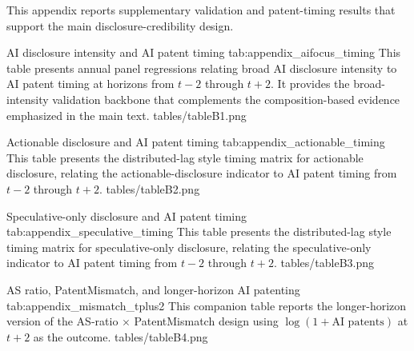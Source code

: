 This appendix reports supplementary validation and patent-timing results that support the main disclosure-credibility design.

\apptablepdf
{AI disclosure intensity and AI patent timing}
{tab:appendix_aifocus_timing}
{This table presents annual panel regressions relating broad AI disclosure intensity to AI patent timing at horizons from $t-2$ through $t+2$. It provides the broad-intensity validation backbone that complements the composition-based evidence emphasized in the main text.}
{tables/tableB1.png}

\apptablepdf
{Actionable disclosure and AI patent timing}
{tab:appendix_actionable_timing}
{This table presents the distributed-lag style timing matrix for actionable disclosure, relating the actionable-disclosure indicator to AI patent timing from $t-2$ through $t+2$.}
{tables/tableB2.png}

\apptablepdf
{Speculative-only disclosure and AI patent timing}
{tab:appendix_speculative_timing}
{This table presents the distributed-lag style timing matrix for speculative-only disclosure, relating the speculative-only indicator to AI patent timing from $t-2$ through $t+2$.}
{tables/tableB3.png}

\apptablepdf
{AS ratio, PatentMismatch, and longer-horizon AI patenting}
{tab:appendix_mismatch_tplus2}
{This companion table reports the longer-horizon version of the AS-ratio $\times$ PatentMismatch design using $\log(1+\text{AI patents})$ at $t+2$ as the outcome.}
{tables/tableB4.png}